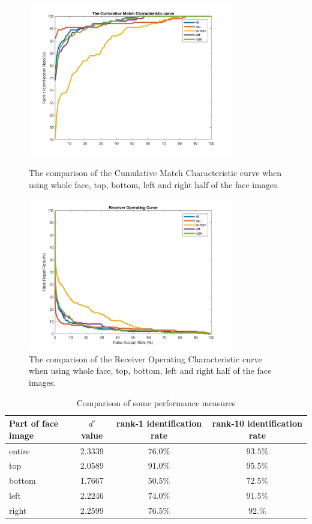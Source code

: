 \documentclass[a4paper]{article}
\begin{document}
\begin{spacing}{2.0}
	\begin{figure}[!htb]
	\begin{minipage}[t]{0.5\linewidth}
	\centering
	\includegraphics[width = 3.5in]{inoneCMC.jpg}
	\caption{The comparison of the Cumulative Match Characteristic curve when using whole face, top, bottom, left and right half of the face images.}
	\label{cmcCom}
	\end{minipage}
	\begin{minipage}[t]{0.5\linewidth}
	\centering
	\includegraphics[width = 3.5in]{inoneROC.jpg}
	\caption{The comparison of the Receiver Operating Characteristic curve when using whole face, top, bottom, left and right half of the face images.}
	\label{rocCom}
	\end{minipage}
	\end{figure}	
	
	\begin{table}[!htb]
	\centering  
	\begin{tabular}{lccc}  
	\hline
	Part of face image & $d'$ value & rank-1 identification rate & rank-10 identification rate\\ \hline  
	entire & 2.3339 & $76.0\%$ & $93.5\%$\\         
	top & 2.0589 & $91.0\%$ & $95.5\%$\\      
	bottom &1.7667 & $50.5\%$ & $72.5\%$\\ 
	left &2.2246 & $74.0\%$ & $91.5\%$\\ 
	right &2.2599 & $76.5\%$ & $92.\%$\\ \hline
	\end{tabular}
	\caption{Comparison of some performance measures}
	\label{comTable}
	\end{table}
	

\end{spacing}
\end{document}

